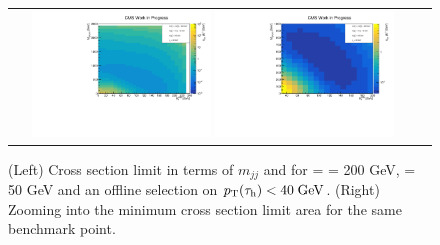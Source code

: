 \begin{figure}[tbh!]
	\centering
	\begin{tabular}{cc}
		\includegraphics[width=0.45\textwidth]{analysis/pics/JetInvMass_vs_MET_xsec_chi200_lsp050_taupt40.pdf}
		\includegraphics[width=0.45\textwidth]{analysis/pics/JetInvMass_vs_MET_xsec_chi200_lsp050_taupt40_zoom.pdf} 		
	\end{tabular}
	\caption{(Left) Cross section limit in terms of $m_{jj}$ and \met for \charginopm = \neutralinotwo = 200 GeV, \neutralinoone = 50 GeV and an offline selection on $p_{\text{T}}(\tau_{\text{h}}) <  40\;\text{Ge}\kern-0.06667em\text{V}$. (Right) Zooming into the minimum cross section limit area for the same benchmark point.}
	\label{fig::JetInvMass_vs_MET_xsec_chi200_lsp050_taupt40}
\end{figure}

